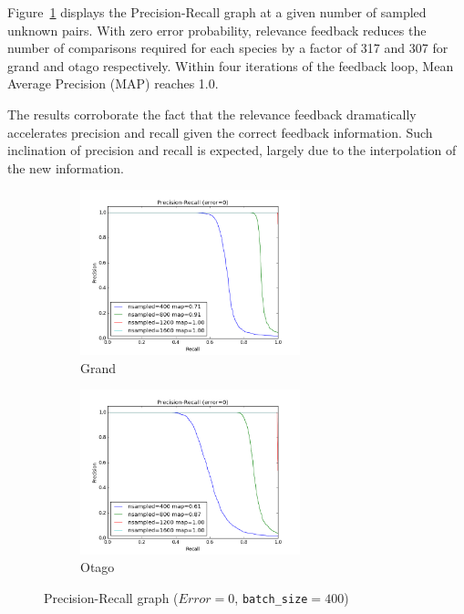 Figure~\ref{fig:pr_curves} displays the Precision-Recall graph at a given
number of sampled unknown pairs. With zero error probability, relevance
feedback reduces the number of comparisons required for each species by a
factor of 317 and 307 for grand and otago respectively. Within four iterations
of the feedback loop, Mean Average Precision (MAP) reaches 1.0.

The results corroborate the fact that the relevance feedback dramatically
accelerates precision and recall given the correct feedback information. Such
inclination of precision and recall is expected, largely due to the
interpolation of the new information.

\begin{figure}[htbp]
  \centering
  \begin{subfigure}[t]{\textwidth}
      \centering
      \includegraphics[width=0.7\textwidth]{pr/grand}
      \caption{Grand}
  \end{subfigure}%

  \begin{subfigure}[t]{\textwidth}
      \centering
      \includegraphics[width=0.7\textwidth]{pr/otago}
      \caption{Otago}
  \end{subfigure}%
  \captionsetup{justification=centering}
  \caption{Precision-Recall graph ($Error=0$, \texttt{batch\_size}$=400$)}
  \label{fig:pr_curves} %
\end{figure}

